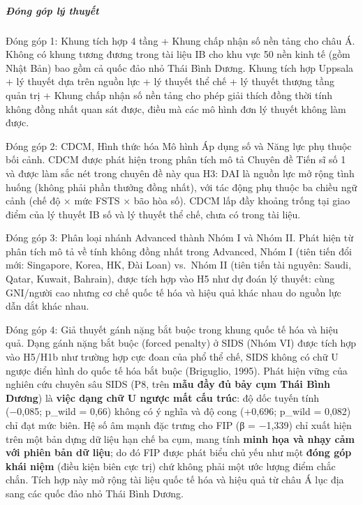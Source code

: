 \documentclass[
  a4paper,
  13pt]{extreport}
\begin{document}
\hypertarget{ux111uxf3ng-guxf3p-luxfd-thuyux1ebft}{%
\subparagraph{Đóng góp lý
thuyết}\label{ux111uxf3ng-guxf3p-luxfd-thuyux1ebft}}

Đóng góp 1: Khung tích hợp 4 tầng + Khung chấp nhận số nền tảng cho châu
Á. Không có khung tương đương trong tài liệu IB cho khu vực 50 nền kinh
tế (gồm Nhật Bản) bao gồm cả quốc đảo nhỏ Thái Bình Dương. Khung tích
hợp Uppsala + lý thuyết dựa trên nguồn lực + lý thuyết thể chế + lý
thuyết thượng tầng quản trị + Khung chấp nhận số nền tảng cho phép giải
thích đồng thời tính không đồng nhất quan sát được, điều mà các mô hình
đơn lý thuyết không làm được.

Đóng góp 2: CDCM, Hình thức hóa Mô hình Áp dụng số và Năng lực phụ thuộc
bối cảnh. CDCM được phát hiện trong phân tích mô tả Chuyên đề Tiến sĩ số
1 và được làm sắc nét trong chuyên đề này qua H3: DAI là nguồn lực mở
rộng tình huống (không phải phần thưởng đồng nhất), với tác động phụ
thuộc ba chiều ngữ cảnh (chế độ × mức FSTS × bão hòa số). CDCM lấp đầy
khoảng trống tại giao điểm của lý thuyết IB số và lý thuyết thể chế,
chưa có trong tài liệu.

Đóng góp 3: Phân loại nhánh Advanced thành Nhóm I và Nhóm II. Phát hiện
từ phân tích mô tả về tính không đồng nhất trong Advanced, Nhóm I (tiên
tiến đổi mới: Singapore, Korea, HK, Đài Loan) vs.~Nhóm II (tiên tiến tài
nguyên: Saudi, Qatar, Kuwait, Bahrain), được tích hợp vào H5 như dự đoán
lý thuyết: cùng GNI/người cao nhưng cơ chế quốc tế hóa và hiệu quả khác
nhau do nguồn lực dẫn dắt khác nhau.

Đóng góp 4: Giả thuyết gánh nặng bắt buộc trong khung quốc tế hóa và
hiệu quả. Dạng gánh nặng bắt buộc (forced penalty) ở SIDS (Nhóm VI) được
tích hợp vào H5/H1b như trường hợp cực đoan của phổ thể chế, SIDS không
có chữ U ngược điển hình do quốc tế hóa bắt buộc (Briguglio, 1995). Phát
hiện vững của nghiên cứu chuyên sâu SIDS (P8, trên \textbf{mẫu đầy đủ
bảy cụm Thái Bình Dương}) là \textbf{việc dạng chữ U ngược mất cấu
trúc}: độ dốc tuyến tính (−0,085; p\_wild = 0,66) không có ý nghĩa và độ
cong (+0,696; p\_wild = 0,082) chỉ đạt mức biên. Hệ số âm mạnh đặc trưng
cho FIP (β = −1,339) chỉ xuất hiện trên một bản dựng dữ liệu hạn chế ba
cụm, mang tính \textbf{minh họa và nhạy cảm với phiên bản dữ liệu}; do
đó FIP được phát biểu chủ yếu như một \textbf{đóng góp khái niệm} (điều
kiện biên cực trị) chứ không phải một ước lượng điểm chắc chắn. Tích hợp
này mở rộng tài liệu quốc tế hóa và hiệu quả từ châu Á lục địa sang các
quốc đảo nhỏ Thái Bình Dương.
\end{document}
